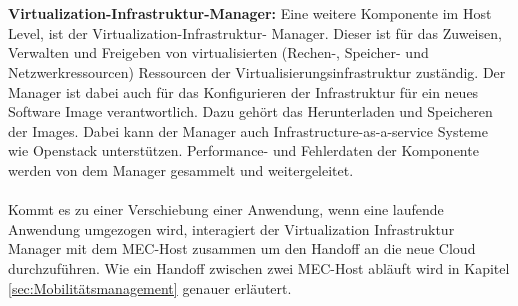 \documentclass[runningheads]{llncs}
\numberwithin{figure}{section}
\begin{document}
\\
\\ 
\textbf{Virtualization-Infrastruktur-Manager:} Eine weitere Komponente im Host Level, ist der Virtualization-Infrastruktur-
Manager. Dieser ist für das Zuweisen, Verwalten und Freigeben von virtualisierten (Rechen-, Speicher- und Netzwerkressourcen)
Ressourcen der Virtualisierungsinfrastruktur zuständig. Der Manager ist dabei auch für das Konfigurieren der Infrastruktur für 
ein neues Software Image verantwortlich. Dazu gehört das Herunterladen und Speicheren der Images. Dabei kann der Manager auch 
Infrastructure-as-a-service Systeme wie Openstack unterstützen. Performance- und Fehlerdaten der Komponente werden von dem Manager gesammelt und weitergeleitet.
\\
\\
Kommt es zu einer Verschiebung einer Anwendung, wenn eine laufende Anwendung umgezogen wird,
interagiert der Virtualization Infrastruktur Manager mit dem MEC-Host zusammen um den Handoff an die neue Cloud durchzuführen.
Wie ein Handoff zwischen zwei MEC-Host abläuft wird in Kapitel \ref{sec:Mobilitätsmanagement} genauer erläutert.
\end{document}
